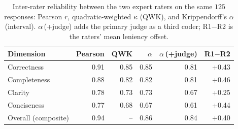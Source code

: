 \begin{table}[H]\centering\footnotesize
\caption{Inter-rater reliability between the two expert raters on the same $125$ responses: Pearson $r$, quadratic-weighted $\kappa$ (QWK), and Krippendorff's $\alpha$ (interval). $\alpha$\,(+judge) adds the primary judge as a third coder; R1$-$R2 is the raters' mean leniency offset.}
\label{tab:interrater}
\begin{tabular}{@{}lrrrrr@{}}
\toprule
Dimension & Pearson & QWK & $\alpha$ & $\alpha$\,(+judge) & R1$-$R2 \\ \midrule
Correctness & 0.91 & 0.85 & 0.85 & 0.81 & +0.43 \\
Completeness & 0.88 & 0.82 & 0.82 & 0.81 & +0.46 \\
Clarity & 0.78 & 0.73 & 0.73 & 0.67 & +0.25 \\
Conciseness & 0.77 & 0.68 & 0.67 & 0.61 & +0.44 \\
\midrule Overall (composite) & 0.94 & -- & 0.86 & 0.84 & +0.40 \\
\bottomrule
\end{tabular}
\end{table}
